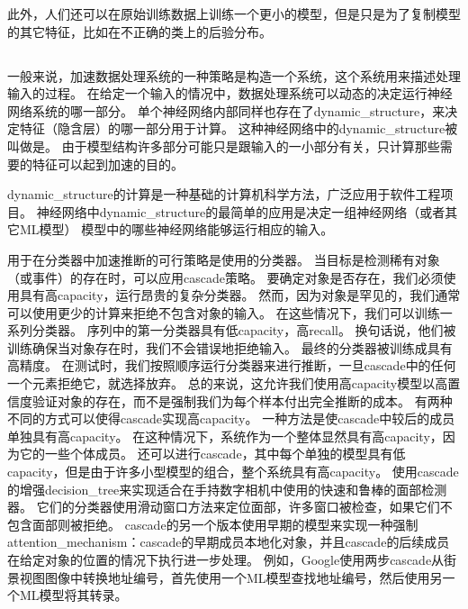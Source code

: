 此外，人们还可以在原始训练数据上训练一个更小的模型，但是只是为了复制模型的其它特征，比如在不正确的类上的后验分布\citep{Hinton-dark-2014,hinton2015distilling}。

\subsection{}
\label{sec:dynamic_structure}

一般来说，加速数据处理系统的一种策略是构造一个系统，这个系统用来描述处理输入的过程。
在给定一个输入的情况中，数据处理系统可以动态的决定运行神经网络系统的哪一部分。
单个神经网络内部同样也存在了\gls{dynamic_structure}，来决定特征（隐含层）的哪一部分用于计算。
这种神经网络中的\gls{dynamic_structure}被叫做是\citep{bengio2013estimating,bengio-arxiv13-condcomp}。
由于模型结构许多部分可能只是跟输入的一小部分有关，只计算那些需要的特征可以起到加速的目的。

\gls{dynamic_structure}的计算是一种基础的计算机科学方法，广泛应用于软件工程项目。
神经网络中\gls{dynamic_structure}的最简单的应用是决定一组神经网络（或者其它\gls{ML}模型）
模型中的哪些神经网络能够运行相应的输入。



用于在分类器中加速推断的可行策略是使用的分类器。 当目标是检测稀有对象（或事件）的存在时，可以应用\gls{cascade}策略。
要确定对象是否存在，我们必须使用具有高\gls{capacity}，运行昂贵的复杂分类器。 
然而，因为对象是罕见的，我们通常可以使用更少的计算来拒绝不包含对象的输入。
在这些情况下，我们可以训练一系列分类器。
序列中的第一分类器具有低\gls{capacity}，高\gls{recall}。
换句话说，他们被训练确保当对象存在时，我们不会错误地拒绝输入。
最终的分类器被训练成具有高精度。
在测试时，我们按照顺序运行分类器来进行推断，一旦\gls{cascade}中的任何一个元素拒绝它，就选择放弃。
总的来说，这允许我们使用高\gls{capacity}模型以高置信度验证对象的存在，而不是强制我们为每个样本付出完全推断的成本。
有两种不同的方式可以使得\gls{cascade}实现高\gls{capacity}。
一种方法是使\gls{cascade}中较后的成员单独具有高\gls{capacity}。
在这种情况下，系统作为一个整体显然具有高\gls{capacity}，因为它的一些个体成员。 还可以进行\gls{cascade}，其中每个单独的模型具有低\gls{capacity}，但是由于许多小型模型的组合，整个系统具有高\gls{capacity}。
\citet{Viola01}使用\gls{cascade}的增强\gls{decision_tree}来实现适合在手持数字相机中使用的快速和鲁棒的面部检测器。
它们的分类器使用滑动窗口方法来定位面部，许多窗口被检查，如果它们不包含面部则被拒绝。
\gls{cascade}的另一个版本使用早期的模型来实现一种强制\gls{attention_mechanism}：\gls{cascade}的早期成员本地化对象，并且\gls{cascade}的后续成员在给定对象的位置的情况下执行进一步处理。
例如，Google使用两步\gls{cascade}从街景视图图像中转换地址编号，首先使用一个\gls{ML}模型查找地址编号，然后使用另一个\gls{ML}模型将其转录\citep{Goodfellow+et+al-ICLR2014a}。

